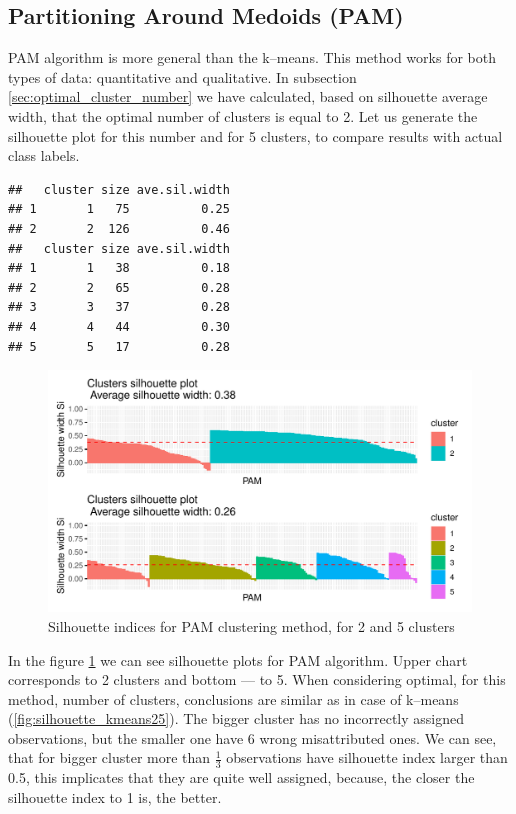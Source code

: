 \documentclass[11pt,a4paper]{article}\usepackage[]{graphicx}\usepackage[]{xcolor}
\makeatletter
\def\maxwidth{ %
  \ifdim\Gin@nat@width>\linewidth
    \linewidth
  \else
    \Gin@nat@width
  \fi
}
\newenvironment{kframe}{%
 \def\at@end@of@kframe{}%
 \ifinner\ifhmode%
  \def\at@end@of@kframe{\end{minipage}}%
  \begin{minipage}{\columnwidth}%
 \fi\fi%
 \def\FrameCommand##1{\hskip\@totalleftmargin \hskip-\fboxsep
 \colorbox{shadecolor}{##1}\hskip-\fboxsep
     \hskip-\linewidth \hskip-\@totalleftmargin \hskip\columnwidth}%
 \MakeFramed {\advance\hsize-\width
   \@totalleftmargin\z@ \linewidth\hsize
   \@setminipage}}%
 {\par\unskip\endMakeFramed%
 \at@end@of@kframe}
\newenvironment{knitrout}{}{} %
\makeatother
\begin{document}
	\subsection{Partitioning Around Medoids (PAM)}
	
	PAM algorithm is more general than the k--means. This method works for both types of data: quantitative and qualitative. In subsection \ref{sec:optimal_cluster_number} we have calculated, based on silhouette average width, that the optimal number of clusters is equal to 2. Let us generate the silhouette plot for this number and for 5 clusters, to compare results with actual class labels.
	
\begin{knitrout}
\color{fgcolor}\begin{kframe}
\begin{verbatim}
##   cluster size ave.sil.width
## 1       1   75          0.25
## 2       2  126          0.46
##   cluster size ave.sil.width
## 1       1   38          0.18
## 2       2   65          0.28
## 3       3   37          0.28
## 4       4   44          0.30
## 5       5   17          0.28
\end{verbatim}
\end{kframe}\begin{figure}
\includegraphics[width=\maxwidth]{figure/silhouette_pam25-1} \caption[Silhouette indices for PAM clustering method, for 2 and 5 clusters]{Silhouette indices for PAM clustering method, for 2 and 5 clusters}\label{fig:silhouette_pam25}
\end{figure}

\end{knitrout}
	
	In the figure \ref{fig:silhouette_pam25} we can see silhouette plots for PAM algorithm. Upper chart corresponds to 2 clusters and bottom --- to 5. When considering optimal, for this method, number of clusters, conclusions are similar as in case of k--means (\ref{fig:silhouette_kmeans25}). The bigger cluster has no incorrectly assigned observations, but the smaller one have 6 wrong misattributed ones. We can see, that for bigger cluster more than $\frac{1}{3}$ observations have silhouette index larger than 0.5, this implicates that they are quite well assigned, because, the closer the silhouette index to 1 is, the better.
	
\end{document}
